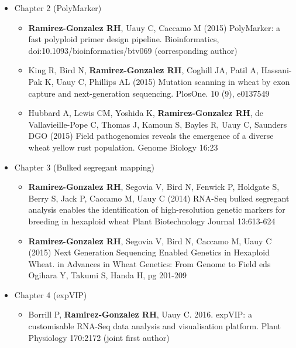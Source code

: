 \begin{itemize}
\item Chapter 2 (PolyMarker)
\begin{itemize}
	\item \textbf{Ramirez-Gonzalez RH}, Uauy C, Caccamo M (2015) PolyMarker: a fast polyploid primer design pipeline. Bioinformatics, doi:10.1093/bioinformatics/btv069 (corresponding author)
	\item King R, Bird N, \textbf{Ramirez-Gonzalez RH}, Coghill JA, Patil A, Hassani-Pak K, Uauy C, Phillips AL (2015) Mutation scanning in wheat by exon capture and next-generation sequencing. PlosOne. 10 (9), e0137549
	\item Hubbard A, Lewis CM, Yoshida K, \textbf{\textbf{Ramirez-Gonzalez RH}}, de Vallavieille-Pope C, Thomas J, Kamoun S, Bayles R, Uauy C, Saunders DGO (2015) Field pathogenomics reveals the emergence of a diverse wheat yellow rust population. Genome Biology 16:23 
\end{itemize}

 \item Chapter 3 (Bulked segregant mapping)
\begin{itemize}
\item	\textbf{Ramirez-Gonzalez RH}, Segovia V, Bird N, Fenwick P, Holdgate S, Berry S, Jack P, Caccamo M, Uauy C (2014) RNA-Seq bulked segregant analysis enables the identification of high-resolution genetic markers for breeding in hexaploid wheat Plant Biotechnology Journal 13:613-624
\item	\textbf{Ramirez-Gonzalez RH}, Segovia V, Bird N, Caccamo M, Uauy C (2015) Next Generation Sequencing Enabled Genetics in Hexaploid Wheat. in Advances in Wheat Genetics: From Genome to Field eds Ogihara Y, Takumi S, Handa H, pg 201-209
\end{itemize}
\item Chapter 4 (expVIP)
\begin{itemize}
	\item Borrill P, \textbf{Ramirez-Gonzalez RH}, Uauy C. 2016. expVIP: a customisable RNA-Seq data analysis and visualisation platform. Plant Physiology 170:2172 (joint first author) 
\end{itemize}
\end{itemize}





